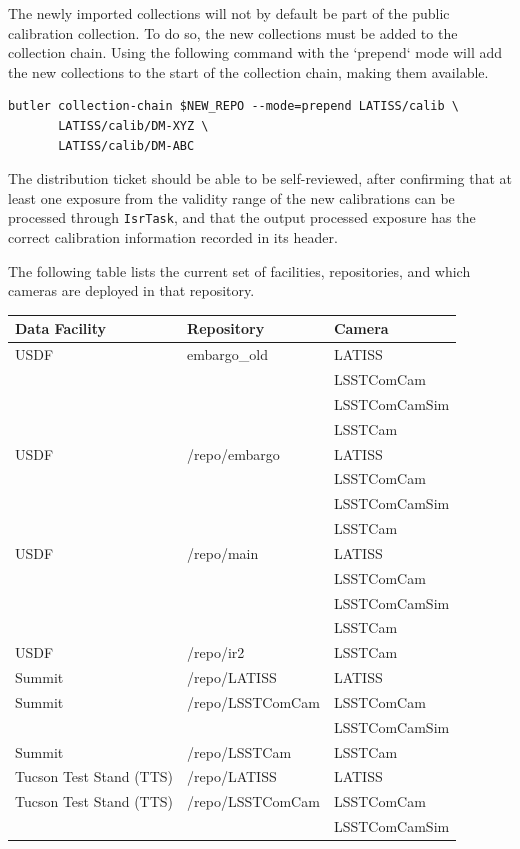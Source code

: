 \documentclass[DM,authoryear,toc]{lsstdoc}
\begin{document}
The newly imported collections will not by default be part of the public calibration collection.
To do so, the new collections must be added to the collection chain.
Using the following command with the `prepend` mode will add the new collections to the start of the collection chain, making them available.
\begin{verbatim}
butler collection-chain $NEW_REPO --mode=prepend LATISS/calib \
       LATISS/calib/DM-XYZ \
       LATISS/calib/DM-ABC
\end{verbatim}
The distribution ticket should be able to be self-reviewed, after confirming that at least one exposure from the validity range of the new calibrations can be processed through \verb|IsrTask|, and that the output processed exposure has the correct calibration information recorded in its header.

The following table lists the current set of facilities, repositories, and which cameras are deployed in that repository.

\begin{tabular}{lll}
  Data Facility & Repository & Camera \\
  \hline
  USDF & embargo\_old & LATISS \\
  & & LSSTComCam \\
  & & LSSTComCamSim \\
  & & LSSTCam \\
  \hline
  USDF & /repo/embargo & LATISS \\
  & & LSSTComCam \\
  & & LSSTComCamSim \\
  & & LSSTCam \\
  \hline
  USDF & /repo/main & LATISS \\
  & & LSSTComCam \\
  & & LSSTComCamSim \\
  & & LSSTCam \\
  \hline
  USDF & /repo/ir2 & LSSTCam \\
  \hline
  Summit & /repo/LATISS & LATISS \\
  Summit & /repo/LSSTComCam & LSSTComCam \\
  & & LSSTComCamSim \\
  Summit & /repo/LSSTCam & LSSTCam \\
  \hline
  Tucson Test Stand (TTS) & /repo/LATISS & LATISS \\
  Tucson Test Stand (TTS) & /repo/LSSTComCam & LSSTComCam \\
  & & LSSTComCamSim \\
  \hline
\end{tabular}
\end{document}
